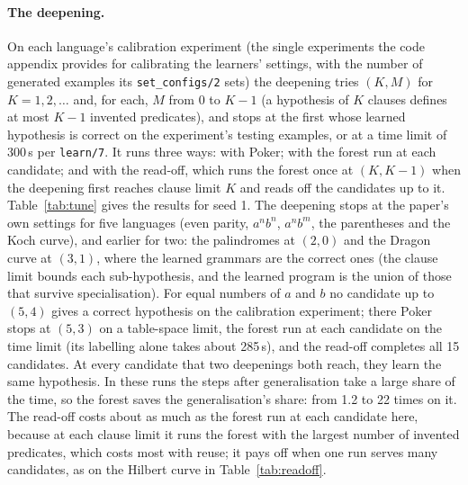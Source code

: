 \documentclass[11pt]{article}
\begin{document}
\paragraph{The deepening.} On each language's calibration experiment (the single
experiments the code appendix provides for calibrating the learners' settings,
with the number of generated examples its \nolinkurl{set_configs/2} sets) the
deepening tries $(K, M)$ for $K = 1, 2, \ldots$ and, for each, $M$ from 0 to
$K - 1$ (a hypothesis of $K$ clauses defines at most $K - 1$ invented predicates),
and stops at the first whose learned hypothesis is correct on the experiment's
testing examples, or at a time limit of 300\,s per \nolinkurl{learn/7}. It runs three
ways: with Poker; with the forest run at each candidate; and with the read-off,
which runs the forest once at $(K, K-1)$ when the deepening first reaches clause
limit $K$ and reads off the candidates up to it. Table~\ref{tab:tune} gives the
results for seed 1.
The deepening stops at the paper's own settings for five languages (even parity,
$a^nb^n$, $a^nb^m$, the parentheses and the Koch curve), and earlier for two: the
palindromes at $(2, 0)$ and the Dragon curve at $(3, 1)$, where the learned grammars
are the correct ones (the clause limit bounds each sub-hypothesis, and the learned
program is the union of those that survive specialisation). For equal numbers of
$a$ and $b$ no candidate up to $(5, 4)$ gives a correct hypothesis on the calibration
experiment; there Poker stops at $(5, 3)$ on a table-space limit, the forest run at
each candidate on the time limit (its labelling alone takes about 285\,s), and the
read-off completes all 15 candidates. At every candidate that two deepenings both
reach, they learn the same hypothesis. In these runs the steps after generalisation
take a large share of the time, so the forest saves the generalisation's share:
from 1.2 to 22 times on it. The read-off costs about as much as the forest run at
each candidate here, because at each clause limit it runs the forest with the
largest number of invented predicates, which costs most with reuse; it pays off when
one run serves many candidates, as on the Hilbert curve in Table~\ref{tab:readoff}.
\end{document}
